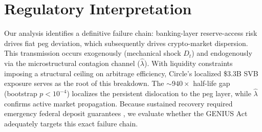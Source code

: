 \documentclass[12pt,twocolumn]{article}
\begin{document}
\begin{table}[H]
\label{tab:arb}
\footnotesize
{}
\caption{Arbitrage profitability by channel/regime with 5 bps taker fees per leg (3-leg intra-exchange; 2-leg cross-exchange).}
\end{table}

\section{Regulatory Interpretation}\label{sec:regulation}



Our analysis identifies a definitive failure chain: banking-layer reserve-access risk drives fiat peg deviation, which subsequently drives crypto-market dispersion. This transmission occurs exogenously (mechanical shock $D_t$) and endogenously via the microstructural contagion channel ($\hat\lambda$). With liquidity constraints imposing a structural ceiling on arbitrage efficiency, Circle's localized \$3.3B SVB exposure \cite{circle2023} serves as the root of this breakdown. The ${\sim}940\times$ half-life gap (bootstrap $p{<}10^{-4}$) localizes the persistent dislocation to the peg layer, while $\hat\lambda$ confirms active market propagation. Because sustained recovery required emergency federal deposit guarantees \cite{jointstatement2023}, we evaluate whether the GENIUS Act adequately targets this exact failure chain.
\end{document}
